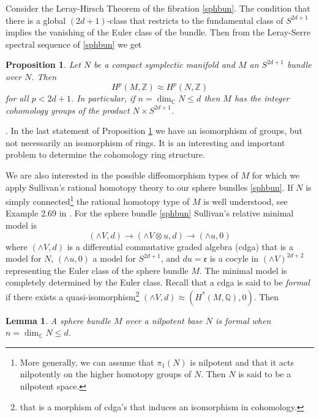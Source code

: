 \documentclass[12pt]{amsart}
\newtheorem{lemma}[theorem]{Lemma}
\newtheorem{proposition}[theorem]{Proposition}
\newenvironment{remark}{\medskip \refstepcounter{theorem}
\noindent  {\bf Remark \thetheorem}.\rm}{\,}
\renewcommand{\thetheorem}{\thesection.\arabic{theorem}}
\def\bbc{{\mathbb C}}
\def\bbq{{\mathbb Q}}
\def\bbz{{\mathbb Z}}
\def\ge{{\mathfrak e}}
\begin{document}
Consider the Leray-Hirsch Theorem of the fibration \eqref{sphbun}. The condition that there is a global $(2d+1)$-class that restricts to the fundamental class of $S^{2d+1}$ implies the vanishing of the Euler class of the bundle. 
Then from the Leray-Serre spectral sequence of \eqref{sphbun} we get

\begin{proposition}\label{fibjointop}
Let $N$ be a compact symplectic manifold and $M$ an $S^{2d+1}$ bundle over $N$. Then 
$$H^p(M,\bbz)\approx H^p(N,\bbz)$$ 
for all $p< 2d+1$. In particular, if $n=\dim_\bbc N\leq d$ then $M$ has the integer cohomology groups of the product $N\times S^{2d+1}$.
\end{proposition}

\begin{remark}\label{grpnotring}
In the last statement of Proposition \ref{fibjointop} we have an isomorphism of groups, but not necessarily an isomorphism of rings. It is an interesting and important problem to determine the cohomology ring structure.
\end{remark}

We are also interested in the possible diffeomorphism types of $M$ for which we apply Sullivan's rational homotopy theory \cite{Sul77} to our sphere bundles \eqref{sphbun}.
If $N$ is simply connected\footnote{More generally, we can assume that $\pi_1(N)$ is nilpotent and that it acts nilpotently on the higher homotopy groups of $N$. Then $N$ is said to be a nilpotent space.} the rational homotopy type of $M$ is well understood, see Example 2.69 in \cite{FeOpTa08}. For the sphere bundle \eqref{sphbun} Sullivan's relative minimal model is
\begin{equation}\label{rathomsphbun}
(\wedge V,d)\longrightarrow (\wedge V\otimes u,d)\longrightarrow (\wedge u,0)
\end{equation}
where $(\wedge V,d)$ is a differential commutative graded algebra (cdga) that is a model for $N$, $(\wedge u,0)$ a model for $S^{2d+1}$, and $du=\ge$ is a cocyle in $(\wedge V)^{2d+2}$ representing the Euler class of the sphere bundle $M$. The minimal model is completely determined by the Euler class. Recall that a cdga is said to be {\it formal} if there exists a quasi-isomorphism\footnote{that is a morphism of cdga's that induces an isomorphism in cohomology.}
$(\wedge V,d)\approx (H^*(M,\bbq),0)$. Then

\begin{lemma}\label{forlem}
A sphere bundle $M$ over a nilpotent base $N$ is formal when $n=\dim_\bbc N\leq d$.
\end{lemma}
\end{document}
